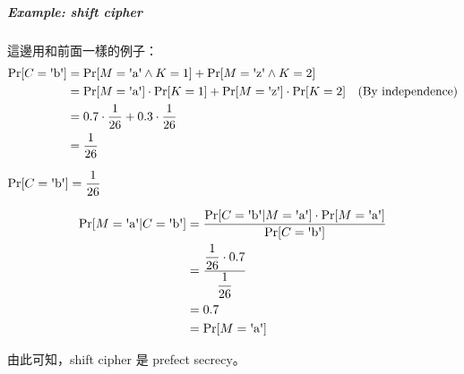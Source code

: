 \subparagraph{Example: shift cipher}

這邊用和前面一樣的例子：
\begin{align*}
	\Pr[C = \text{\textquotesingle{}b\textquotesingle}] &= 
			\Pr[M = \text{\textquotesingle{}a\textquotesingle} \wedge K = 1] +
			\Pr[M = \text{\textquotesingle{}z\textquotesingle} \wedge K = 2] \\
		&= \Pr[M = \text{\textquotesingle{}a\textquotesingle}] \cdot \Pr[K = 1] + 
			\Pr[M = \text{\textquotesingle{}z\textquotesingle}] \cdot \Pr[K = 2]
			\quad \text{(By independence)} \\
		&= 0.7 \cdot \frac{1}{26} + 0.3 \cdot \frac{1}{26} \\
		&= \frac{1}{26}
\end{align*}

\(\Pr[C = \text{\textquotesingle{}b\textquotesingle}] = \displaystyle{\frac{1}{26}}\)

\begin{align*}
	\Pr[M = \text{\textquotesingle{}a\textquotesingle} | C =  \text{\textquotesingle{}b\textquotesingle}] &=
	\frac{
		\Pr[C = \text{\textquotesingle{}b\textquotesingle} | M = \text{\textquotesingle{}a\textquotesingle}] \cdot \Pr[M = \text{\textquotesingle{}a\textquotesingle}]
	}
	{\Pr[C = \text{\textquotesingle{}b\textquotesingle}]} \\
	&= \frac{\displaystyle{\frac{1}{26}} \cdot 0.7}{\displaystyle{\frac{1}{26}}} \\
	&= 0.7 \\
	&= \Pr[M = \text{\textquotesingle{}a\textquotesingle}]
\end{align*}

由此可知，shift cipher 是 prefect secrecy。

